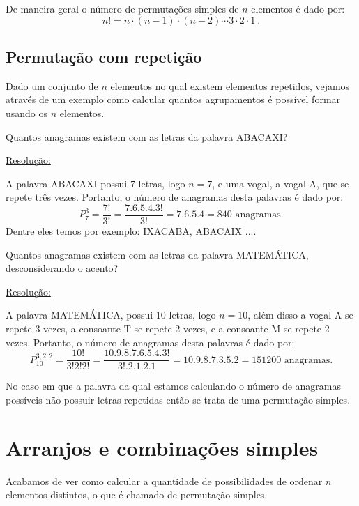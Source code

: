 De maneira geral o número de permutações simples de $n$ elementos é dado por:
\[n!= n \cdot (n-1) \cdot (n-2) \cdots 3 \cdot 2 \cdot 1 \ .\]



\subsection{Permutação com repetição}

Dado um conjunto de $n$ elementos no qual existem elementos repetidos, vejamos através de um exemplo como calcular quantos agrupamentos é possível formar usando os $n$ elementos.

\begin{exem}
 Quantos anagramas existem com as letras da palavra ABACAXI?
 
 \underline{Resolução:}
 
 A palavra ABACAXI possui 7 letras, logo $n=7$, e uma vogal, a vogal A, que se repete três vezes. Portanto, o número de anagramas desta palavras é dado por:
 \[P_{7}^{3}= \frac{7!}{3!}= \frac{7.6.5.4.3!}{3!}= 7.6.5.4= 840 \text{ anagramas.}\]
 Dentre eles temos por exemplo: IXACABA, ABACAIX .... 
\end{exem}

\begin{exem}
 Quantos anagramas existem com as letras da palavra MATEMÁTICA, desconsiderando o acento?
 
 \underline{Resolução:}
 
 A palavra MATEMÁTICA, possui 10 letras, logo $n=10$, além disso a vogal A se repete 3 vezes, a consoante T se repete 2 vezes, e a consoante M se repete 2 vezes. Portanto, o número de anagramas desta palavras é dado por:
 \[P_{10}^{3;2;2}= \frac{10!}{3!2!2!}= \frac{10.9.8.7.6.5.4.3!}{3!.2.1.2.1}= 10.9.8.7.3.5.2= 151200 \text{ anagramas.} \]
 
\end{exem}

\begin{obs}
 No caso em que a palavra da qual estamos calculando o número de anagramas possíveis não possuir letras repetidas então se trata de uma permutação simples.
\end{obs}

\section{Arranjos e combinações simples}

Acabamos de ver como calcular a quantidade de possibilidades de ordenar $n$ elementos distintos, o que é chamado de permutação simples.

